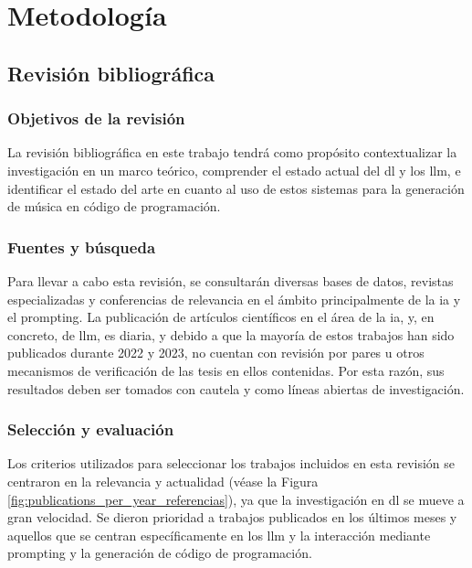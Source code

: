 \chapter{Metodología}



\section{Revisión bibliográfica}

\subsection{Objetivos de la revisión}
La revisión bibliográfica en este trabajo tendrá como propósito contextualizar la investigación en un marco teórico, comprender el estado actual del \gls{dl} y los \gls{llm}, e identificar el estado del arte en cuanto al uso de estos sistemas para la generación de música en código de programación.

\subsection{Fuentes y búsqueda}
Para llevar a cabo esta revisión, se consultarán diversas bases de datos, revistas especializadas y conferencias de relevancia en el ámbito principalmente de la \gls{ia} y el prompting. La publicación de artículos científicos en el área de la \gls{ia}, y, en concreto, de \gls{llm}, es diaria, y debido a que la mayoría de estos trabajos han sido publicados durante 2022 y 2023, no cuentan con revisión por pares u otros mecanismos de verificación de las tesis en ellos contenidas. Por esta razón, sus resultados deben ser tomados con cautela y como líneas abiertas de investigación.


\subsection{Selección y evaluación}
Los criterios utilizados para seleccionar los trabajos incluidos en esta revisión se centraron en la relevancia y actualidad (véase la Figura \ref{fig:publications_per_year_referencias}), ya que la investigación en \gls{dl} se mueve a gran velocidad. Se dieron prioridad a trabajos publicados en los últimos meses y aquellos que se centran específicamente en  los \gls{llm} y la interacción mediante prompting y la generación de código de programación.

